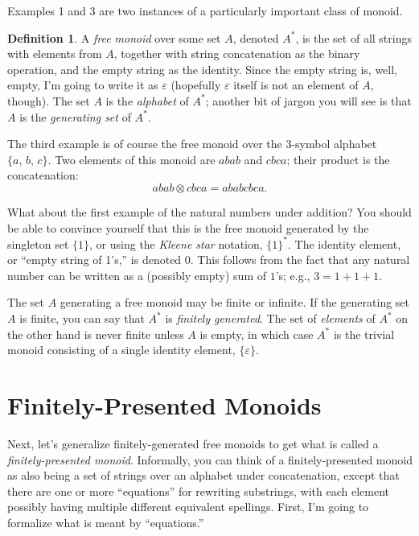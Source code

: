 \documentclass[headsepline,bibliography=totoc]{scrreport}
\theoremstyle{definition}
\theoremstyle{definition}
\newtheorem{definition}{Definition}[chapter]
\theoremstyle{definition}
\begin{document}
Examples 1 and 3 are two instances of a particularly important class of monoid.
\begin{definition}
A \emph{free monoid} over some set $A$, denoted $A^*$, is the set of all strings with elements from $A$, together with string concatenation as the binary operation, and the empty string as the identity. Since the empty string is, well, empty, I'm going to write it as $\varepsilon$ (hopefully $\varepsilon$ itself is not an element of $A$, though). The set $A$ is the \emph{alphabet} of $A^*$; another bit of jargon you will see is that $A$ is the \emph{generating set} of $A^*$.
\end{definition}

The third example is of course the free monoid over the 3-symbol alphabet $\{a,\,b,\,c\}$. Two elements of this monoid are $abab$ and $cbca$; their product is the concatenation:
\[abab\otimes cbca=ababcbca.\]

What about the first example of the natural numbers under addition? You should be able to convince yourself that this is the free monoid generated by the singleton set $\{1\}$, or using the \emph{Kleene star} notation, $\{1\}^*$. The identity element, or ``empty string of 1's,'' is denoted $0$. This follows from the fact that any natural number can be written as a (possibly empty) sum of $1$'s; e.g., $3=1+1+1$.

The set $A$ generating a free monoid may be finite or infinite. If the generating set $A$ is finite, you can say that $A^*$ is \emph{finitely generated}. The set of \emph{elements} of $A^*$ on the other hand is never finite unless $A$ is empty, in which case $A^*$ is the trivial monoid consisting of a single identity element, $\{\varepsilon\}$.

\section{Finitely-Presented Monoids}
Next, let's generalize finitely-generated free monoids to get what is called a \emph{finitely-presented monoid}. Informally, you can think of a finitely-presented monoid as also being a set of strings over an alphabet under concatenation, except that there are one or more ``equations'' for rewriting substrings, with each element possibly having multiple different equivalent spellings. First, I'm going to formalize what is meant by ``equations.''
\end{document}

